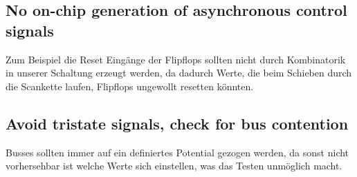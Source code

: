 \documentclass[12pt,a4paper]{article}
\begin{document}
\subsection{No on-chip generation of asynchronous control signals}
Zum Beispiel die Reset Eingänge der Flipflops sollten nicht durch Kombinatorik in unserer Schaltung erzeugt werden, da dadurch Werte, die beim Schieben durch die Scankette laufen, Flipflops ungewollt resetten könnten.
\subsection{Avoid tristate signals, check for bus contention}
Busses sollten immer auf ein definiertes Potential gezogen werden, da sonst nicht vorhersehbar ist welche Werte sich einstellen, was das Testen unmöglich macht.
\end{document}
